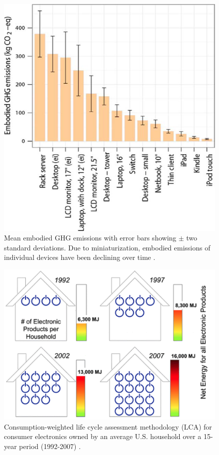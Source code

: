 \documentclass{article}
\begin{document}
\begin{figure}[h]
    \includegraphics[width=.6 \textwidth]{./images/ICT_embodied_emissions.png}
    \centering
    \caption{Mean embodied GHG emissions with error bars showing $\pm$ two standard deviations. Due to miniaturization, embodied emissions of individual devices have been declining over time \cite{teehan2013comparing}.} 
    \label{ICT_embodied_emissions}
\end{figure}

\begin{figure}[h]
    \includegraphics[width=.6 \textwidth]{./images/household_ICT_devices.png}
    \centering
    \caption{Consumption-weighted life cycle assessment methodology (LCA) for consumer electronics owned by an average U.S. household over a 15-year period (1992-2007) \cite{ryen2015consumption}.}
    \label{Household_ICT_Devices}
\end{figure}

\end{document}
